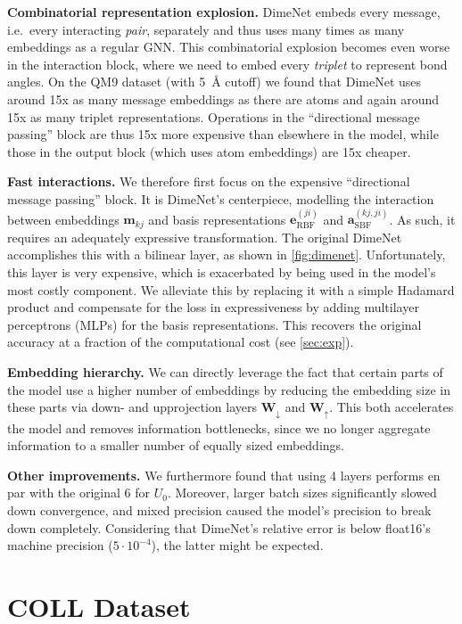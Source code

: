 \documentclass{article}
\def\va{{\bm{a}}}
\def\ve{{\bm{e}}}
\def\vm{{\bm{m}}}
\def\mW{{\bm{W}}}
\begin{document}
\textbf{Combinatorial representation explosion.} DimeNet embeds every message, i.e.\ every interacting \emph{pair}, separately and thus uses many times as many embeddings as a regular GNN. This combinatorial explosion becomes even worse in the interaction block, where we need to embed every \emph{triplet} to represent bond angles. On the QM9 dataset (with \SI{5}{\angstrom} cutoff) we found that DimeNet uses around 15x as many message embeddings as there are atoms and again around 15x as many triplet representations. Operations in the ``directional message passing'' block are thus 15x more expensive than elsewhere in the model, while those in the output block (which uses atom embeddings) are 15x cheaper.

\textbf{Fast interactions.} We therefore first focus on the expensive ``directional message passing'' block. It is DimeNet's centerpiece, modelling the interaction between embeddings $\vm_{kj}$ and basis representations $\ve_\text{RBF}^{(ji)}$ and $\va_\text{SBF}^{(kj,ji)}$. As such, it requires an adequately expressive transformation. The original DimeNet accomplishes this with a bilinear layer, as shown in \cref{fig:dimenet}. Unfortunately, this layer is very expensive, which is exacerbated by being used in the model's most costly component. We alleviate this by replacing it with a simple Hadamard product and compensate for the loss in expressiveness by adding multilayer perceptrons (MLPs) for the basis representations. This recovers the original accuracy at a fraction of the computational cost (see \cref{sec:exp}).

\textbf{Embedding hierarchy.} We can directly leverage the fact that certain parts of the model use a higher number of embeddings by reducing the embedding size in these parts via down- and upprojection layers $\mW_{\downarrow}$ and $\mW_{\uparrow}$. This both accelerates the model and removes information bottlenecks, since we no longer aggregate information to a smaller number of equally sized embeddings.

\textbf{Other improvements.} We furthermore found that using 4 layers performs en par with the original 6 for $U_0$. Moreover, larger batch sizes significantly slowed down convergence, and mixed precision caused the model's precision to break down completely. Considering that DimeNet's relative error is below float16's machine precision ($5 \cdot 10^{-4}$), the latter might be expected.

\section{\textsc{COLL} Dataset}
\end{document}
